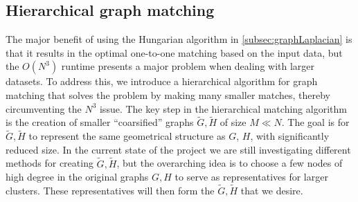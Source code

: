 \documentclass{article}[11pt]
\begin{document}


\subsection{Hierarchical graph matching}
\label{subsec:hierarchical}

The major benefit of using the Hungarian algorithm in
\ref{subsec:graphLaplacian} is that it results in the optimal one-to-one
matching based on the input data, but the $O(N^3)$ runtime presents a major
problem when dealing with larger datasets. To address this, we introduce a
hierarchical algorithm for graph matching that solves the problem by making many
smaller matches, thereby circumventing the $N^3$ issue. The key step in the
hierarchical matching algorithm is the creation of smaller ``coarsified'' graphs
$\tilde{G},\tilde{H}$ of size $M \ll N$. The goal is for $\tilde{G},\tilde{H}$
to represent the same geometrical structure as $G$, $H$, with significantly
reduced size. In the current state of the project we are still investigating
different methods for creating $\tilde{G},\tilde{H}$, but the overarching idea
is to choose a few nodes of high degree in the original graphs $G,H$ to serve as
representatives for larger clusters. These representatives will then form the
$\tilde{G},\tilde{H}$ that we desire.
\end{document}
